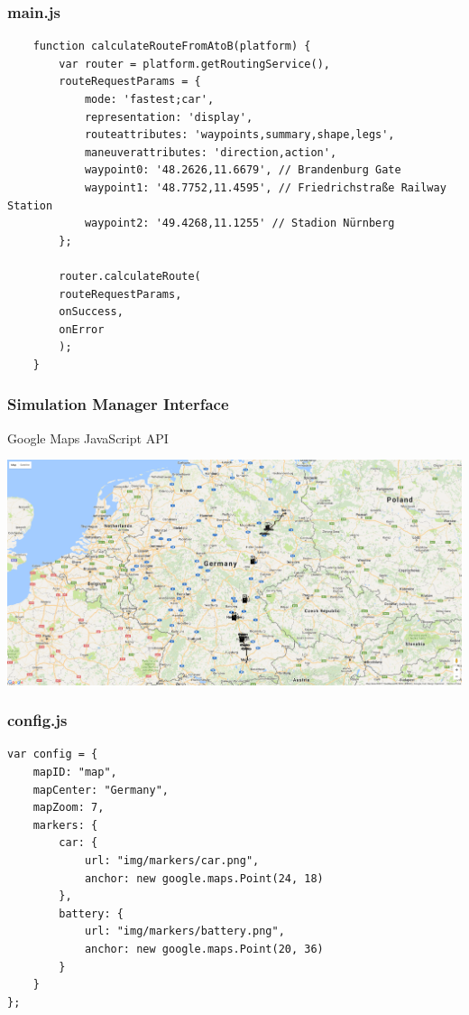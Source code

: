 \begin{frame}[fragile]
	\frametitle{main.js}
	
	\begin{verbatim}
	function calculateRouteFromAtoB(platform) {
		var router = platform.getRoutingService(),
		routeRequestParams = {
			mode: 'fastest;car',
			representation: 'display',
			routeattributes: 'waypoints,summary,shape,legs',
			maneuverattributes: 'direction,action',
			waypoint0: '48.2626,11.6679', // Brandenburg Gate
			waypoint1: '48.7752,11.4595', // Friedrichstraße Railway Station
			waypoint2: '49.4268,11.1255' // Stadion Nürnberg
		};
		
		router.calculateRoute(
		routeRequestParams,
		onSuccess,
		onError
		);
	}
	\end{verbatim}
	
\end{frame}
\clearpage




\begin{frame}
\frametitle{Simulation Manager Interface}

Google Maps JavaScript API \\

\vspace*{-3mm}
\begin{minipage}[t][0cm]{\paperwidth}%
\hspace*{-\PraesentationSeitenrand}%
\includegraphics[width=\paperwidth]{images/simulation_manager.png}
\end{minipage}

\end{frame}
\clearpage



\begin{frame}[fragile]
\frametitle{config.js}

\begin{verbatim}
var config = {
    mapID: "map",
    mapCenter: "Germany",
    mapZoom: 7,
    markers: {
        car: {
            url: "img/markers/car.png",
            anchor: new google.maps.Point(24, 18)
        },
        battery: {
            url: "img/markers/battery.png",
            anchor: new google.maps.Point(20, 36)
        }
    }
};
\end{verbatim}

\end{frame}
\clearpage


